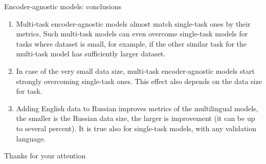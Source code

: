 \begin{frame}{Encoder-agnostic models: conclusions}
\begin{enumerate}
\item Multi-task encoder-agnostic models almost match single-task ones by their metrics. Such multi-task models can even overcome single-task models for tasks where dataset is small, for example, if the other similar task for the multi-task model has sufficiently larger dataset. 
\item In case of the very small data size, multi-task encoder-agnostic models start strongly overcoming single-task ones. This effect also depends on the data size for task. 
\item Adding English data to Russian improves metrics of the multilingual models, the smaller is the Russian data size, the larger is improvement (it can be up to several percent). It is true also for single-task models, with any validation language.
\end{enumerate}
\end{frame}

\begin{frame}{Thanks for your attention}
\end{frame}

